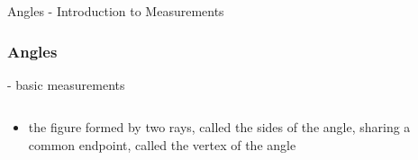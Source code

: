 \begin{omgroup}{Angles - Introduction to Measurements}
\begin{frame}
  \frametitle{Angles}
  \begin{module}[id=angle]
  - basic measurements\\
  \begin{columns}
    \begin{column}{5.8cm}
      \begin{itemize}
      \item
      \begin{definition}
         the figure formed by two rays, called the sides of the angle, sharing a common endpoint, called the vertex of the angle
      \end{definition}
    \end{itemize}
    \end{column}
    \begin{column}{5.5cm}
    \end{column}
  \end{columns}
\end{module}
\end{frame}
\end{omgroup}
